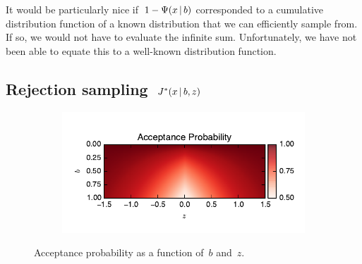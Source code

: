 \documentclass[aos,preprint]{imsart}
\begin{document}
It would be particularly nice if~$1-\Psi(x \,|\, b)$ corresponded to
a cumulative distribution function of a known distribution that we can
efficiently sample from. If so, we would not have to evaluate the
infinite sum. Unfortunately, we have not been able to equate this to a
well-known distribution function.

\subsection{Rejection sampling~$J^{*}(x \,|\, b,z)$}

\begin{figure}
\centering
  \begin{subfigure}[t]{4in}
    \centering
    \vskip 0pt
    \includegraphics[width=\textwidth]{acceptance}
  \end{subfigure}
  \vspace{-2em}
  \caption{Acceptance probability as a function of~$b$ and~$z$.}
\label{fig:acceptance}
\end{figure}
\end{document}
